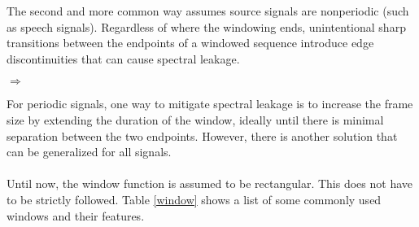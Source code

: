 \documentclass{report}
\begin{document}
The second and more common way assumes source signals are nonperiodic (such as speech signals). Regardless of where the windowing ends, unintentional sharp transitions between the endpoints of 
a windowed sequence introduce edge discontinuities that can cause spectral leakage.
\begin{center}
     $\Longrightarrow$
\end{center}
For periodic signals, one way to mitigate spectral leakage is to increase the frame size by extending the duration of the window, 
ideally until there is minimal separation between the two endpoints. However, there is another solution that can be generalized for all signals.
\\ \\
Until now, the window function is assumed to be rectangular. This does not have to be strictly followed. Table \ref{window} shows a list of some commonly used 
windows and their features. 
\end{document}
